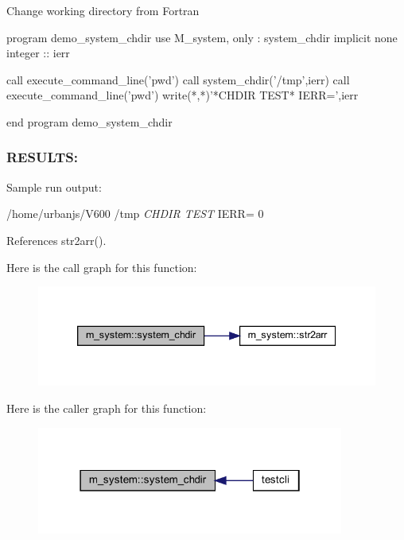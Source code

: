 \begin{DoxyVerb}Change working directory from Fortran

  program demo_system_chdir
  use M_system, only : system_chdir
  implicit none
  integer :: ierr

  call execute_command_line('pwd')
  call system_chdir('/tmp',ierr)
  call execute_command_line('pwd')
  write(*,*)'*CHDIR TEST* IERR=',ierr

  end program demo_system_chdir
\end{DoxyVerb}


\subsubsection*{R\+E\+S\+U\+L\+TS\+:}

Sample run output\+:

/home/urbanjs/\+V600 /tmp {\itshape C\+H\+D\+IR T\+E\+ST} I\+E\+RR= 0 

References str2arr().

Here is the call graph for this function\+:
\nopagebreak
\begin{figure}[H]
\begin{center}
\leavevmode
\includegraphics[width=339pt]{namespacem__system_a47746b670cb21bae0957c9bb2bccf209_cgraph}
\end{center}
\end{figure}
Here is the caller graph for this function\+:
\nopagebreak
\begin{figure}[H]
\begin{center}
\leavevmode
\includegraphics[width=286pt]{namespacem__system_a47746b670cb21bae0957c9bb2bccf209_icgraph}
\end{center}
\end{figure}
\mbox{\label{namespacem__system_ace9ce0c8a9c8341a76b8903cd2390ce3}} 
